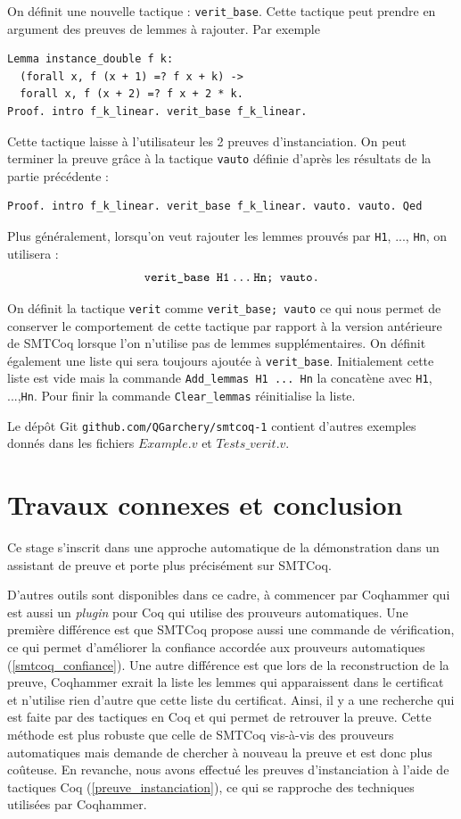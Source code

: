 \documentclass[11pt]{article}
\begin{document}
On définit une nouvelle tactique : \texttt{verit\_base}. Cette tactique peut prendre en argument des preuves de lemmes à rajouter. Par exemple 
\begin{lstlisting}[frame=single]
Lemma instance_double f k:
  (forall x, f (x + 1) =? f x + k) ->
  forall x, f (x + 2) =? f x + 2 * k.
Proof. intro f_k_linear. verit_base f_k_linear.
\end{lstlisting}
Cette tactique laisse à l'utilisateur les 2 preuves d'instanciation. On peut terminer la preuve grâce à la tactique \texttt{vauto} définie d'après les résultats de la partie précédente : 
\begin{lstlisting}[frame=single]
Proof. intro f_k_linear. verit_base f_k_linear. vauto. vauto. Qed
\end{lstlisting}
Plus généralement, lorsqu'on veut rajouter les lemmes prouvés par \texttt{H1}, ..., \texttt{Hn}, on utilisera : 
\[\texttt{verit\_base H1\,...\,Hn; vauto.}\]

On définit la tactique \texttt{verit} comme \texttt{verit\_base; vauto} ce qui nous permet de conserver le comportement de cette tactique par rapport à la version antérieure de SMTCoq lorsque l'on n'utilise pas de lemmes supplémentaires. On définit également une liste qui sera toujours ajoutée à \texttt{verit\_base}. Initialement cette liste est vide mais la commande \texttt{Add\_lemmas H1\,...\,Hn} la concatène avec \texttt{H1}, ...,\texttt{Hn}. Pour finir la commande \texttt{Clear\_lemmas} réinitialise la liste. 

Le dépôt Git \texttt{github.com/QGarchery/smtcoq-1} contient d'autres exemples donnés dans les fichiers $Example.v$ et $Tests\_verit.v$.


\section{Travaux connexes et conclusion}

Ce stage s'inscrit dans une approche automatique de la démonstration dans un assistant de preuve et porte plus précisément sur SMTCoq. 

D'autres outils sont disponibles dans ce cadre, à commencer par Coqhammer \cite{coqhammer} qui est aussi un \textit{plugin} pour Coq qui utilise des prouveurs automatiques. Une première différence est que SMTCoq propose aussi une commande de vérification, ce qui permet d'améliorer la confiance accordée aux prouveurs automatiques (\ref{smtcoq_confiance}). Une autre différence est que lors de la reconstruction de la preuve, Coqhammer exrait la liste les lemmes qui apparaissent dans le certificat et n'utilise rien d'autre que cette liste du certificat. Ainsi, il y a une recherche qui est faite par des tactiques en Coq et qui permet de retrouver la preuve. Cette méthode est plus robuste que celle  de SMTCoq vis-à-vis des prouveurs automatiques mais demande de chercher à nouveau la preuve et est donc plus coûteuse. En revanche, nous avons effectué les preuves d'instanciation  à l'aide de tactiques Coq (\ref{preuve_instanciation}), ce qui se rapproche des techniques utilisées par Coqhammer. 
\end{document}
